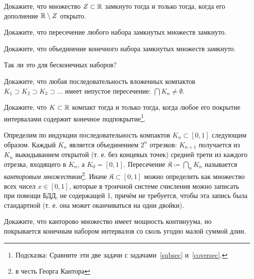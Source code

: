 \documentclass[a4paper, 12pt, num=29]{listok}
\begin{document}
\begin{problem}
	Докажите, что множество $Z \subset \mathbb{R}$ замкнуто тогда и только тогда, когда его дополнение $\mathbb{R} \setminus Z$ открыто.
\end{problem}
\begin{problem}
	Докажите, что пересечение любого набора замкнутых множеств замкнуто.
\end{problem}
\begin{problem}
\begin{probparts}
	\item Докажите, что объединение конечного набора замкнутых множеств замкнуто.
	\item Так ли это для бесконечных наборов?
\end{probparts}
\end{problem}
\begin{problem}
	Докажите, что любая последовательность вложенных компактов $K_1 \supset K_2 \supset K_3 \supset \ldots$
	имеет непустое пересечение: $\bigcap K_n \ne \emptyset$.
\end{problem}
\begin{problem}
	Докажите, что $K \subset \mathbb{R}$ компакт тогда и только тогда, когда любое его покрытие интервалами содержит конечное подпокрытие\footnote{%
		Подсказка: Сравните эти две задачи с задачами~\ref{subsec} и~\ref{coversec}.
	}.
\end{problem}
\begin{definition}
	Определим по индукции последовательность компактов $K_n \subset \left [ 0, 1 \right ]$ следующим образом.
	Каждый $K_n$ является объединением $2^n$ отрезков: $K_{n + 1}$ получается из $K_n$ выкидыванием открытой
	(т. е. без концевых точек) средней трети из каждого отрезка, входящего в $K_n$, а $K_0 = \left [ 0, 1 \right ]$.
	Пересечение $\mathfrak{K} \coloneq \bigcap_n K_n$ называется \textit{канторовым множеством}\footnote{%
	в честь Георга Кантора
	}.
	Иначе $\mathfrak{K} \subset \left [ 0, 1 \right ]$ можно определить как множество всех чисел $x \in \left [ 0, 1 \right ]$,
	которые в троичной системе счисления можно записать при помощи БДД, не содержащей 1, причём не требуется, чтобы эта запись была стандартной
	(т. е. она может оканчиваться на одни двойки).
\end{definition}
\begin{problem}
	Докажите, что канторово множество имеет мощность континуума, но покрывается конечным набором интервалов со сколь угодно малой суммой длин.
\end{problem}
\end{document}
